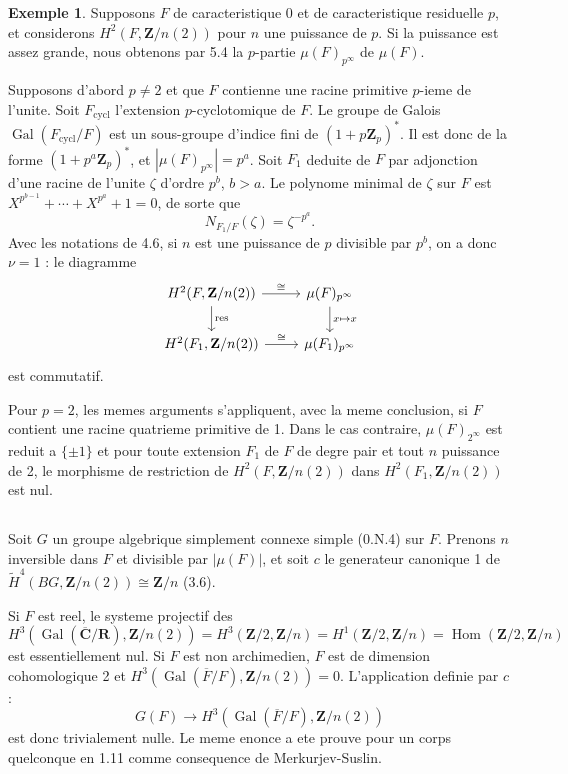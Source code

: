 \documentclass[11pt,a4paper]{article}
\theoremstyle{plain}
\theoremstyle{definition}
\newtheorem{example}[theorem]{Exemple}
\DeclareMathOperator{\Gal}{Gal}
\DeclareMathOperator{\Hom}{Hom}
\DeclareMathOperator{\res}{res}
\begin{document}
\begin{example}\label{5.8}
Supposons $F$ de caracteristique 0 et de caracteristique residuelle $p$, et considerons $H^2(F, \mathbf{Z}/n(2))$ pour $n$ une puissance de $p$. Si la puissance est assez grande, nous obtenons par 5.4 la $p$-partie $\mu(F)_{p^\infty}$ de $\mu(F)$.

Supposons d'abord $p \neq 2$ et que $F$ contienne une racine primitive $p$-ieme de l'unite. Soit $F_{\text{cycl}}$ l'extension $p$-cyclotomique de $F$. Le groupe de Galois $\Gal(F_{\text{cycl}}/F)$ est un sous-groupe d'indice fini de $(1 + p\mathbf{Z}_p)^*$. Il est donc de la forme $(1 + p^a \mathbf{Z}_p)^*$, et $|\mu(F)_{p^\infty}| = p^a$. Soit $F_1$ deduite de $F$ par adjonction d'une racine de l'unite $\zeta$ d'ordre $p^b$, $b > a$. Le polynome minimal de $\zeta$ sur $F$ est $X^{p^{b-1}} + \cdots + X^{p^a} + 1 = 0$, de sorte que
\[
N_{F_1/F}(\zeta) = \zeta^{-p^a}.
\]
Avec les notations de 4.6, si $n$ est une puissance de $p$ divisible par $p^b$, on a donc $\nu = 1$ : le diagramme
\[
\begin{tikzcd}
H^2(F, \mathbf{Z}/n(2)) \arrow{r}{\cong} \arrow{d}{\res} & \mu(F)_{p^\infty} \arrow{d}{x \mapsto x} \\
H^2(F_1, \mathbf{Z}/n(2)) \arrow{r}{\cong} & \mu(F_1)_{p^\infty}
\end{tikzcd}
\]
est commutatif.

Pour $p = 2$, les memes arguments s'appliquent, avec la meme conclusion, si $F$ contient une racine quatrieme primitive de 1. Dans le cas contraire, $\mu(F)_{2^\infty}$ est reduit a $\{\pm 1\}$ et pour toute extension $F_1$ de $F$ de degre pair et tout $n$ puissance de 2, le morphisme de restriction de $H^2(F, \mathbf{Z}/n(2))$ dans $H^2(F_1, \mathbf{Z}/n(2))$ est nul.
\end{example}

\subsection{}\label{5.9}

Soit $G$ un groupe algebrique simplement connexe simple (0.N.4) sur $F$. Prenons $n$ inversible dans $F$ et divisible par $|\mu(F)|$, et soit $c$ le generateur canonique 1 de $\widetilde{H}^4(BG, \mathbf{Z}/n(2)) \cong \mathbf{Z}/n$ (3.6).

Si $F$ est reel, le systeme projectif des
\[
H^3(\Gal(\overline{\mathbf{C}}/\mathbf{R}), \mathbf{Z}/n(2)) = H^3(\mathbf{Z}/2, \mathbf{Z}/n) = H^1(\mathbf{Z}/2, \mathbf{Z}/n) = \Hom(\mathbf{Z}/2, \mathbf{Z}/n)
\]
est essentiellement nul. Si $F$ est non archimedien, $F$ est de dimension cohomologique 2 et $H^3(\Gal(\overline{F}/F), \mathbf{Z}/n(2)) = 0$. L'application definie par $c$ :
\[
G(F) \to H^3(\Gal(\overline{F}/F), \mathbf{Z}/n(2))
\]
est donc trivialement nulle. Le meme enonce a ete prouve pour un corps quelconque en 1.11 comme consequence de Merkurjev-Suslin.
\end{document}
